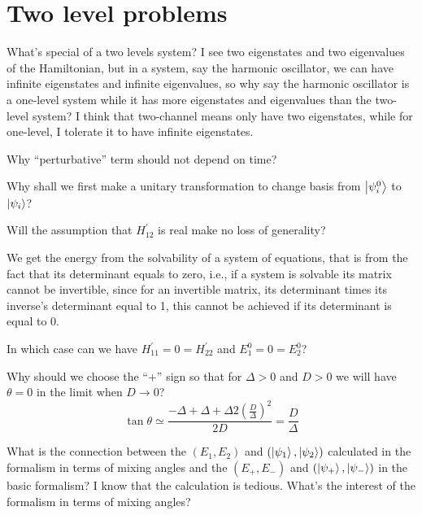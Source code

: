 \section{Two level problems}
What's special of a two levels system? I see two eigenstates and two eigenvalues of the Hamiltonian, but in a system, say the harmonic oscillator, we can have infinite eigenstates and infinite eigenvalues, so why say the harmonic oscillator is a one-level system while it has more eigenstates and eigenvalues than the two-level system? I think that two-channel means only have two eigenstates, while for one-level, I tolerate it to have infinite eigenstates.

Why “perturbative” term should not depend on time?

Why shall we first make a unitary transformation to change basis from $\left\lvert \psi_{i}^{0}\right\rangle$ to $\left\lvert \psi_i\right\rangle$?

Will the assumption that $H_{12}^{'}$ is real make no loss of generality? 

We get the energy from the solvability of a system of equations, that is from the fact that its determinant equals to zero, i.e., if a system is solvable its matrix cannot be invertible, since for an invertible matrix, its determinant times its inverse's determinant equal to 1, this cannot be achieved if its determinant is equal to 0.

In which case can we have $H_{11}^{'}=0=H_{22}^{'}$ and $E_1^{0}=0=E_2^{0}$?

Why should we choose the “+” sign so that for $\Delta>0$ and $D>0$ we will have $\theta=0$ in the limit when $D\longrightarrow 0$? 
$$
\tan\theta\simeq \frac{-\Delta+\Delta+\Delta2\left(\frac{D}{\Delta}\right)^2}{2D}=\frac{D}{\Delta}
$$

What is the connection between the $(E_{1},E_{2})$ and $(\left\lvert \psi_{1}\right\rangle,\left\lvert \psi_{2}\right\rangle)$ calculated in the formalism in terms of mixing angles and the $(E_{+},E_{-})$ and $(\left\lvert \psi_{+}\right\rangle,\left\lvert \psi_{-}\right\rangle)$ in the basic formalism? I know that the calculation is tedious. What's the interest of the formalism in terms of mixing angles?